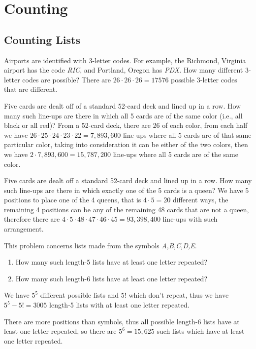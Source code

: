 \documentclass[DIN, pagenumber=false, fontsize=11pt, parskip=half]{scrartcl}
\title{}
\author{} %
\date{}
\begin{document}
\maketitle

\setcounter{section}{2}

\section{Counting}

\subsection{Counting Lists}

\begin{problems}
    \problem Airports are identified with 3-letter codes. For example, the Richmond, Virginia airport has the code \textit{RIC}, and Portland, Oregon has \textit{PDX}. How many different 3-letter codes are possible? 
    \answer There are $26 \cdot 26 \cdot 26 = 17576$ possible 3-letter codes that are different. 

    \problem Five cards are dealt off of a standard 52-card deck and lined up in a row. How many such line-ups are there in which all 5 cards are of the same color (i.e., all black or all red)?
    \answer From a 52-card deck, there are 26 of each color, from each half we have $26 \cdot 25 \cdot 24 \cdot 23 \cdot 22 = 7,893,600$ line-ups where all 5 cards are of that same particular color, taking into consideration it can be either of the two colors, then we have $2 \cdot 7,893,600 = 15,787,200$ line-ups where all 5 cards are of the same color.

    \problem Five cards are dealt off a standard 52-card deck and lined up in a row. How many such line-ups are there in which exactly one of the 5 cards is a queen?
    \answer We have 5 positions to place one of the 4 queens, that is $4 \cdot 5 = 20$ different ways, the remaining 4 positions can be any of the remaining 48 cards that are not a queen, therefore there are $4 \cdot 5 \cdot 48 \cdot 47 \cdot 46 \cdot 45 = 93,398,400$ line-ups with such arrangement.

    \problem This problem concerns lists made from the symbols \textit{A,B,C,D,E}.
    \begin{enumerate}[label=\alph*)]
        \item How many such length-5 lists have at least one letter repeated?
        \item How many such length-6 lists have at least one letter repeated?
    \end{enumerate}
    \answer
    \begin{parts}
        \item We have $5^5$ different possible lists and $5!$ which don't repeat, thus we have $5^5 - 5! = 3005$ length-5 lists with at least one letter repeated.
        \item There are more positions than symbols, thus all possible length-6 lists have at least one letter repeated, so there are $5^6 = 15,625$ such lists which have at least one letter repeated.
    \end{parts}


\end{problems}
\end{document}

